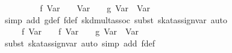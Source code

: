 \begin{isabellebody}
\ \ \isamarkupfalse%
\ \isamarkupfalse%
\ {}{}{}{}\ {}\ {}\ {}{}\ f\ {}Var\ {}{}{}\ {}\ {}{}\ Var\ {}{}\ {}\ {}{}\ g\ {}Var\ {}{}\ {}Var\ {}{}{}\isanewline
\ \ \ \ \isamarkupfalse%
\ {}simp\ add{}\ g{}def\ f{}def\ skd{}mult{}assoc{}\ subst\ skat{}assign{}{}var{}\ auto{}\isanewline
\ \ \isamarkupfalse%
\ \isamarkupfalse%
\ {}{}{}{}\ {}\ {}\ {}{}\ f\ {}Var\ {}{}{}\ {}\ {}{}\ f\ {}Var\ {}{}{}\ {}\ {}{}\ g\ {}Var\ {}{}\ {}Var\ {}{}{}\isanewline
\ \ \ \ \isamarkupfalse%
\ {}subst\ skat{}assign{}{}var{}\ {}auto\ simp\ add{}\ f{}def{}\isanewline

\end{isabellebody}
